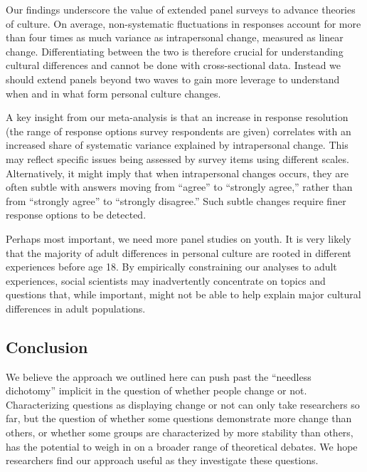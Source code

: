 \documentclass[
  12pt,
]{article}
\begin{document}
Our findings underscore the value of extended panel surveys to advance
theories of culture. On average, non-systematic fluctuations in
responses account for more than four times as much variance as
intrapersonal change, measured as linear change. Differentiating between
the two is therefore crucial for understanding cultural differences and
cannot be done with cross-sectional data. Instead we should extend
panels beyond two waves to gain more leverage to understand when and in
what form personal culture changes.

A key insight from our meta-analysis is that an increase in response
resolution (the range of response options survey respondents are given)
correlates with an increased share of systematic variance explained by
intrapersonal change. This may reflect specific issues being assessed by
survey items using different scales. Alternatively, it might imply that
when intrapersonal changes occurs, they are often subtle with answers
moving from ``agree'' to ``strongly agree,'' rather than from ``strongly
agree'' to ``strongly disagree.'' Such subtle changes require finer
response options to be detected.

Perhaps most important, we need more panel studies on youth. It is very
likely that the majority of adult differences in personal culture are
rooted in different experiences before age 18. By empirically
constraining our analyses to adult experiences, social scientists may
inadvertently concentrate on topics and questions that, while important,
might not be able to help explain major cultural differences in adult
populations.

\hypertarget{conclusion}{%
\subsection{Conclusion}\label{conclusion}}

We believe the approach we outlined here can push past the ``needless
dichotomy'' implicit in the question of whether people change or not.
Characterizing questions as displaying change or not can only take
researchers so far, but the question of whether some questions
demonstrate more change than others, or whether some groups are
characterized by more stability than others, has the potential to weigh
in on a broader range of theoretical debates. We hope researchers find
our approach useful as they investigate these questions.

\theendnotes

\singlespace
\end{document}
